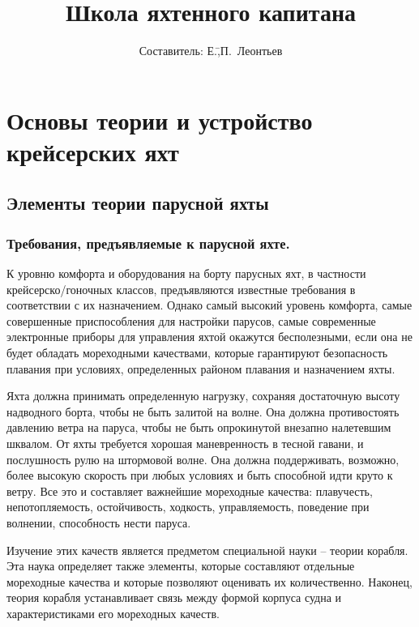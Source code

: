 \documentclass[a4paper, 12pt, twoside, final, book, russian, fittopage, cyremdash]{ncc}
\begin{document}
\frontmatter

\author{\LARGE Составитель: Е.\=,П.~Леонтьев}
\title{Школа яхтенного капитана}
\titlefoot{\theyear}
\maketitle

{\small \tableofcontents}
{\small \listoffigures}
{\small \listoftables}

\mainmatter

\part{Основы теории и устройство крейсерских яхт}

\chapter{Элементы теории парусной яхты}

\section{Требования, предъявляемые к парусной яхте.}

К уровню комфорта и оборудования на борту парусных яхт, в частности крейсерско\-/гоночных классов, предъявляются известные требования в соответствии с их назначением. Однако самый высокий уровень комфорта, самые совершенные приспособления для настройки парусов, самые современные электронные приборы для управления яхтой окажутся бесполезными, если она не будет обладать мореходными качествами, которые гарантируют безопасность плавания при условиях, определенных районом плавания и назначением яхты.

Яхта должна принимать определенную нагрузку, сохраняя достаточную высоту надводного борта, чтобы не быть залитой на волне. Она должна противостоять давлению ветра на паруса, чтобы не быть опрокинутой внезапно налетевшим шквалом. От яхты требуется хорошая маневренность в тесной гавани, и послушность рулю на штормовой волне. Она должна поддерживать, возможно, более высокую скорость при любых условиях и быть способной идти круто к ветру. Все это и составляет важнейшие мореходные качества: плавучесть, непотопляемость, остойчивость, ходкость, управляемость, поведение при волнении, способность нести паруса.

Изучение этих качеств является предметом специальной науки \--- теории корабля. Эта наука определяет также элементы, которые составляют отдельные мореходные качества и которые позволяют оценивать их количественно. Наконец, теория корабля устанавливает связь между формой корпуса судна и характеристиками его мореходных качеств.
\end{document}

